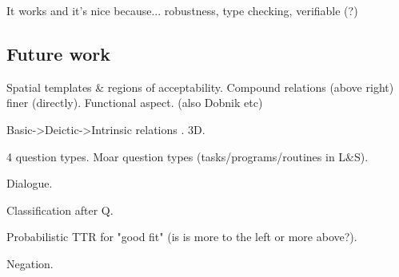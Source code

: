 \documentclass[11pt, a4paper]{article}
\begin{document}
It works and it's nice because...
robustness, type checking, verifiable (?)



\subsection{Future work}

Spatial templates \& regions of acceptability. Compound relations (above right) finer (directly). Functional aspect.  \cite{LoganComputationalAnalysisApprehension1996} (also Dobnik etc)

Basic->Deictic->Intrinsic relations  \cite{LoganComputationalAnalysisApprehension1996}. 3D.

4 question types.
Moar question types (tasks/programs/routines in L\&S).

Dialogue.

Classification after Q.

Probabilistic TTR for "good fit" (is is more to the left or more above?).

Negation.




\end{document}
